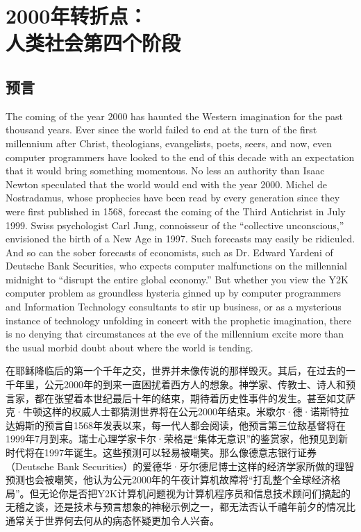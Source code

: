 \chapter[人类社会第四个阶段]{2000年转折点：\\人类社会第四个阶段}

\section{预言}

\begin{Parallel}{97mm}{45mm}
  
  \ParallelLText
  {The coming of the year 2000 has haunted the Western imagination for the past thousand years. Ever since the world failed to end at the turn of the first millennium after Christ, theologians, evangelists, poets, seers, and now, even computer programmers have looked to the end of this decade with an expectation that it would bring something momentous. No less an authority than Isaac Newton speculated that the world would end with the year 2000. Michel de Nostradamus, whose prophecies have been read by every generation since they were first published in 1568, forecast the coming of the Third Antichrist in July 1999. Swiss psychologist Carl Jung, connoisseur of the “collective unconscious,” envisioned the birth of a New Age in 1997. Such forecasts may easily be ridiculed. And so can the sober forecasts of economists, such as Dr. Edward Yardeni of Deutsche Bank Securities, who expects computer malfunctions on the millennial midnight to “disrupt the entire global economy.” But whether you view the Y2K computer problem as groundless hysteria ginned up by computer programmers and Information Technology consultants to stir up business, or as a mysterious instance of technology unfolding in concert with the prophetic imagination, there is no denying that circumstances at the eve of the millennium excite more than the usual morbid doubt about where the world is tending.  }
  
  \ParallelRText
  {\small 在耶稣降临后的第一个千年之交，世界并未像传说的那样毁灭。其后，在过去的一千年里，公元2000年的到来一直困扰着西方人的想象。神学家、传教士、诗人和预言家，都在张望着本世纪最后十年的结束，期待着历史性事件的发生。甚至如艾萨克·牛顿这样的权威人士都猜测世界将在公元2000年结束。米歇尔·德·诺斯特拉达姆斯的预言自1568年发表以来，每一代人都会阅读，他预言第三位敌基督将在1999年7月到来。瑞士心理学家卡尔·荣格是“集体无意识”的鉴赏家，他预见到新时代将在1997年诞生。这些预测可以轻易被嘲笑。那么像德意志银行证券（Deutsche Bank Securities）的爱德华·牙尔德尼博士这样的经济学家所做的理智预测也会被嘲笑，他认为公元2000年的午夜计算机故障将“打乱整个全球经济格局”。但无论你是否把Y2K计算机问题视为计算机程序员和信息技术顾问们搞起的无稽之谈，还是技术与预言想象的神秘示例之一，都无法否认千禧年前夕的情况比通常关于世界何去何从的病态怀疑更加令人兴奋。 }
  

\end{Parallel}
